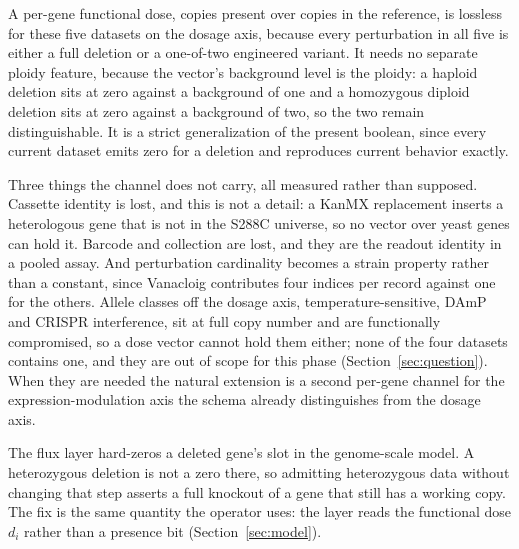 A per-gene functional dose, copies present over copies in the reference, is lossless for
these five datasets on the dosage axis, because every perturbation in all five is either a
full deletion or a one-of-two engineered variant. It needs no separate ploidy feature,
because the vector's background level is the ploidy: a haploid deletion sits at zero against
a background of one and a homozygous diploid deletion sits at zero against a background of
two, so the two remain distinguishable. It is a strict generalization of the present
boolean, since every current dataset emits zero for a deletion and reproduces current
behavior exactly.

Three things the channel does not carry, all measured rather than supposed. Cassette identity
is lost, and this is not a detail: a KanMX replacement inserts a heterologous gene that is
not in the S288C universe, so no vector over yeast genes can hold it. Barcode and collection
are lost, and they are the readout identity in a pooled assay. And perturbation cardinality
becomes a strain property rather than a constant, since Vanacloig contributes four indices per
record against one for the others. Allele classes off the dosage axis, temperature-sensitive,
DAmP and CRISPR interference, sit at full copy number and are functionally compromised, so a
dose vector cannot hold them either; none of the four datasets contains one, and they are out
of scope for this phase (Section~\ref{sec:question}). When they are needed the natural
extension is a second per-gene channel for the expression-modulation axis the schema already
distinguishes from the dosage axis.

The flux layer hard-zeros a deleted gene's slot in the genome-scale model. A heterozygous
deletion is not a zero there, so admitting heterozygous data without changing that step
asserts a full knockout of a gene that still has a working copy. The fix is the same quantity
the operator uses: the layer reads the functional dose $d_i$ rather than a presence bit
(Section~\ref{sec:model}).

